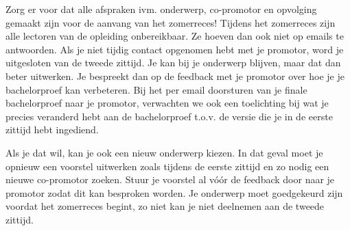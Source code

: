  Zorg er voor dat alle afspraken ivm.   onderwerp,  co-promotor en  opvolging   gemaakt  zijn voor de aanvang van het zomerreces! Tijdens het zomerreces zijn alle lectoren van de opleiding onbereikbaar. Ze hoeven dan ook niet op emails te antwoorden. Als je niet tijdig contact opgenomen hebt met je promotor, word je uitgesloten van de tweede zittijd. Je kan bij je onderwerp blijven, maar dat dan beter uitwerken.  Je bespreekt dan op de feedback met je promotor over hoe je je bachelorproef kan verbeteren. Bij het per email doorsturen van je finale bachelorproef naar je promotor, verwachten we ook een toelichting bij wat je precies veranderd hebt aan de bachelorproef t.o.v. de versie die je in de eerste zittijd hebt ingediend.

Als je dat wil, kan je ook een nieuw onderwerp kiezen.  In dat geval moet je opnieuw een voorstel uitwerken zoals tijdens de eerste zittijd en zo nodig een nieuwe co-promotor zoeken. Stuur je voorstel al vóór de feedback door naar je promotor zodat dit kan besproken worden. Je onderwerp moet goedgekeurd zijn voordat het zomerreces begint, zo niet kan je niet deelnemen aan de tweede zittijd.

